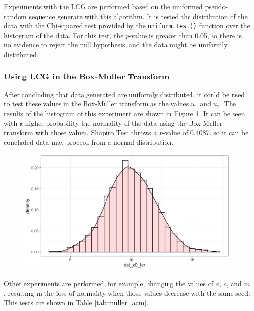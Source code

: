 \documentclass[10pt,leter,openany]{article}
\begin{document}
		Experiments with the LCG are performed based on the uniformed pseudo-random sequence generate with this algorithm. It is tested the distribution of the data with the Chi-squared test provided by the \texttt{uniform.test()} function over the histogram of the data. For this test, the $p$-value is greater than 0.05, so there is no evidence to reject the null hypothesis, and the data might be uniformly distributed.


	\subsubsection{Using LCG in the  Box-Muller Transform}

		After concluding that data generated are uniformly distributed, it could be used to test these values in the Box-Muller transform as the values $ u_{1} $ and $u_{2}$. 
		The results of the histogram of this experiment are shown in Figure \ref{fig:hist2}. It can be seen with a higher probability the normality of the data using the Box-Muller transform with those values. Shapiro Test throws a $p$-value of  0.4087, so it can be concluded data may proceed from a normal distribution.


		\begin{figure}
			\begin{center}
				\includegraphics[scale=0.30]{extras/hist2}
				\label{fig:hist2}
			\end{center}
		\end{figure}


		Other experiments are performed, for example, changing the values of $ a $, $ c $, and $ m $, resulting in the loss of normality when those values decrease with the same seed. This tests are shown in Table \ref{tab:muller_acm}.
\end{document}
